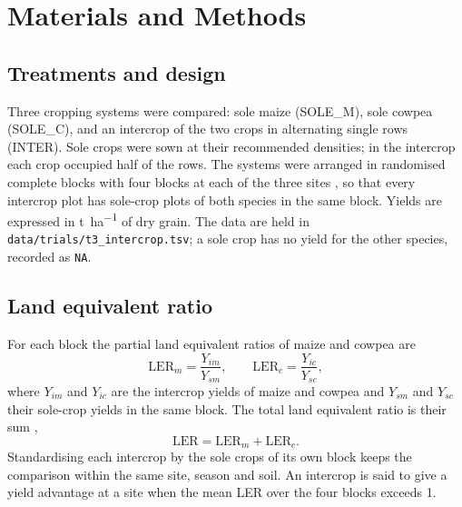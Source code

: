 \section{Materials and Methods}

\subsection{Treatments and design}
Three cropping systems were compared: sole maize (SOLE\_M), sole cowpea
(SOLE\_C), and an intercrop of the two crops in alternating single rows
(INTER). Sole crops were sown at their recommended densities; in the intercrop
each crop occupied half of the rows. The systems were arranged in randomised
complete blocks with four blocks at each of the three sites
\parencite{gomez1984}, so that every intercrop plot has sole-crop plots of both
species in the same block. Yields are expressed in \si{\tonne\per\hectare} of
dry grain. The data are held in \texttt{data/trials/t3\_intercrop.tsv}; a sole
crop has no yield for the other species, recorded as \texttt{NA}.

\subsection{Land equivalent ratio}
For each block the partial land equivalent ratios of maize and cowpea are
\begin{equation}
  \mathrm{LER}_m = \frac{Y_{im}}{Y_{sm}}, \qquad
  \mathrm{LER}_c = \frac{Y_{ic}}{Y_{sc}},
  \label{eq:partialler}
\end{equation}
where $Y_{im}$ and $Y_{ic}$ are the intercrop yields of maize and cowpea and
$Y_{sm}$ and $Y_{sc}$ their sole-crop yields in the same block. The total land
equivalent ratio is their sum \parencite{mead1980},
\begin{equation}
  \mathrm{LER} = \mathrm{LER}_m + \mathrm{LER}_c .
  \label{eq:ler}
\end{equation}
Standardising each intercrop by the sole crops of its own block keeps the
comparison within the same site, season and soil. An intercrop is said to give
a yield advantage at a site when the mean LER over the four blocks exceeds 1.

